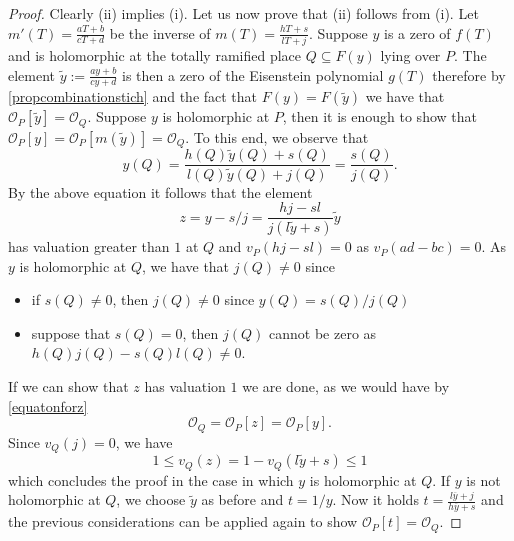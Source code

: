\documentclass[10pt]{amsart}
\newcommand{\cO}{\mathcal{O}}
\theoremstyle{definition}
\theoremstyle{remark}
\numberwithin{equation}{section}
\begin{document}
\begin{proof}
Clearly (ii) implies (i). Let us now prove that (ii) follows from (i). Let $m'(T)=\frac{aT+b}{cT+d}$ be the inverse of $m(T)=\frac{hT+s}{lT+j}$.
Suppose $y$ is a zero of $f(T)$ and is holomorphic at the totally ramified place $Q\subseteq F(y)$ lying over $P$. The element 
$\tilde y:=\frac{ay+b}{cy+d}$ is then a zero of the Eisenstein polynomial $g(T)$ therefore by 
\ref{propcombinationstich} and the fact that $F(y)=F(\tilde y)$ we have that $\cO_P[\tilde y]=\cO_Q$. 
Suppose $y$ is holomorphic at $P$, then it is enough to show that 
$\cO_P[y]=\cO_P[m(\tilde y)]=\cO_Q$.
To this end, we observe that
\[y(Q)=\frac{h(Q)\tilde y(Q)+s(Q)}{l(Q)\tilde y(Q)+j(Q)}=
\frac{s(Q)}{j(Q)}.\]
By the above equation it follows that the element 
\begin{equation}\label{equatonforz}
z=y-s/j=\frac{hj-sl}{j(l\tilde{y}+s)}\tilde y
\end{equation}
 has valuation 
greater than $1$ at $Q$ and $v_P(hj-sl)=0$ as $v_P(ad-bc)=0$.
As $y$ is holomorphic at $Q$, we have that $j(Q)\neq 0$ since
\begin{itemize}
\item if $s(Q)\neq 0$, then $j(Q)\neq 0$ since $y(Q)=s(Q)/j(Q)$
\item suppose that $s(Q)=0$, then $j(Q)$ cannot be zero as $h(Q)j(Q)-s(Q)l(Q)\neq 0$.
\end{itemize}
If we can show that $z$ has valuation $1$ we are done, as we would have by \eqref{equatonforz}
\[\cO_Q=\cO_P[z]=\cO_P[y].\]
Since $v_Q(j)=0$, we have
\[1\leq v_Q(z)=1-v_Q(l\tilde y+ s)\leq 1\]
which concludes the proof in the case in which $y$ is holomorphic at $Q$.
If $y$ is not holomorphic at $Q$, we choose $\tilde y$ as before and $t=1/y$. Now it holds $t=\frac{l \overline y+ j}{h\overline y + s}$ and the previous considerations can be applied again to show $\cO_P[t]=\cO_Q$. 


%
%
 





\end{proof}
\end{document}
